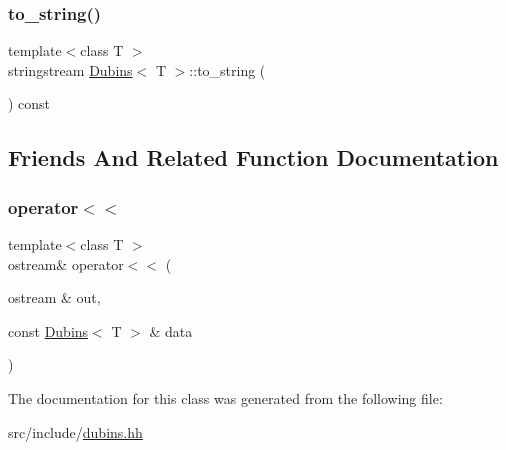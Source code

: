 \mbox{\label{class_dubins_a08abdf02352b6d47aafeea1eed9bfbfe}} 
\subsubsection{\texorpdfstring{to\_string()}{to\_string()}}
{\footnotesize\ttfamily template$<$class T $>$ \\
stringstream \mbox{\hyperlink{class_dubins}{Dubins}}$<$ T $>$\+::to\+\_\+string (\begin{DoxyParamCaption}{ }\end{DoxyParamCaption}) const\hspace{0.3cm}{\ttfamily [inline]}}



\subsection{Friends And Related Function Documentation}
\mbox{\label{class_dubins_a0178baccb8eb26af22a5eb717f394c8c}} 
\subsubsection{\texorpdfstring{operator$<$$<$}{operator<<}}
{\footnotesize\ttfamily template$<$class T $>$ \\
ostream\& operator$<$$<$ (\begin{DoxyParamCaption}\item[{ostream \&}]{out,  }\item[{const \mbox{\hyperlink{class_dubins}{Dubins}}$<$ T $>$ \&}]{data }\end{DoxyParamCaption})\hspace{0.3cm}{\ttfamily [friend]}}



The documentation for this class was generated from the following file\+:\begin{DoxyCompactItemize}
\item 
src/include/\mbox{\hyperlink{dubins_8hh}{dubins.\+hh}}\end{DoxyCompactItemize}
